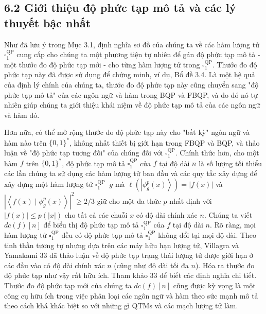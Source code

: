 \documentclass[10pt]{article}
\begin{document}
\begin{enumerate}
\subsection*{6.2 Giới thiệu độ phức tạp mô tả và các lý thuyết bậc nhất}
Như đã lưu ý trong Mục 3.1, định nghĩa sơ đồ của chúng ta về các hàm lượng tử $\square_{1}^{\mathrm{QP}}$ cung cấp cho chúng ta một phương tiện tự nhiên để gán độ phức tạp mô tả - một thước đo độ phức tạp mới - cho từng hàm lượng tử trong $\square_{1}^{\mathrm{QP}}$. Thước đo độ phức tạp này đã được sử dụng để chứng minh, ví dụ, Bổ đề 3.4. Là một hệ quả của định lý chính của chúng ta, thước đo độ phức tạp này cũng chuyển sang "độ phức tạp mô tả" của các ngôn ngữ và hàm trong BQP và FBQP, và do đó nó tự nhiên giúp chúng ta giới thiệu khái niệm về độ phức tạp mô tả của các ngôn ngữ và hàm đó.

Hơn nữa, có thể mở rộng thước đo độ phức tạp này cho "bất kỳ" ngôn ngữ và hàm nào trên $\{0,1\}^{*}$, không nhất thiết bị giới hạn trong FBQP và BQP, và thảo luận về "độ phức tạp tương đối" của chúng đối với $\square_{1}^{\mathrm{QP}}$. Chính thức hơn, cho một hàm $f$ trên $\{0,1\}^{*}$, độ phức tạp mô tả $\square_{1}^{\mathrm{QP}}$ của $f$ tại độ dài $n$ là số lượng tối thiểu các lần chúng ta sử dụng các hàm lượng tử ban đầu và các quy tắc xây dựng để xây dựng một hàm lượng tử $\square_{1}^{\text {QP }}$ $g$ mà $\ell\left(\left|\phi_{g}^{p}(x)\right\rangle\right)=|f(x)|$ và $\left|\left\langle f(x) \mid \phi_{g}^{p}(x)\right\rangle\right|^{2} \geq 2 / 3$ giữ cho một đa thức $p$ nhất định với $|f(x)| \leq p(|x|)$ cho tất cả các chuỗi $x$ có độ dài chính xác $n$. Chúng ta viết $d c(f)[n]$ để biểu thị độ phức tạp mô tả $\square_{1}^{\mathrm{QP}}$ của $f$ tại độ dài $n$. Rõ ràng, mọi hàm lượng tử $\square_{1}^{\mathrm{QP}}$ đều có độ phức tạp mô tả $\square_{1}^{\mathrm{QP}}$ không đổi tại mọi độ dài. Theo tinh thần tương tự nhưng dựa trên các máy hữu hạn lượng tử, Villagra và Yamakami 33 đã thảo luận về độ phức tạp trạng thái lượng tử được giới hạn ở các đầu vào có độ dài chính xác $n$ (cũng như độ dài tối đa $n$). Hóa ra thước đo độ phức tạp như vậy rất hữu ích. Tham khảo 33 để biết các định nghĩa chi tiết. Thước đo độ phức tạp mới của chúng ta $d c(f)[n]$ cũng được kỳ vọng là một công cụ hữu ích trong việc phân loại các ngôn ngữ và hàm theo sức mạnh mô tả theo cách khá khác biệt so với những gì QTMs và các mạch lượng tử làm.


\end{enumerate}
\end{document}
